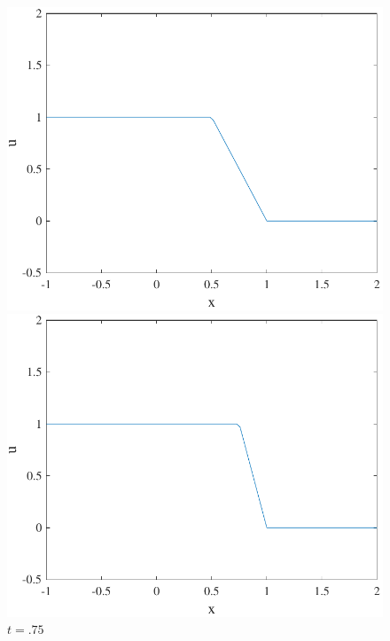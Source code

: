 \documentclass{article}
\begin{document}
\begin{figure}[H]
\begin{minipage}[b]{0.49\textwidth}
  \end{minipage}
    \hfill
  \begin{minipage}[b]{0.49\textwidth}
    \includegraphics[width=\textwidth]{hw_14_plot7.pdf}
    \caption{$t = 0.5$}

  \end{minipage}
    \hfill
  \begin{minipage}[b]{0.49\textwidth}
    \includegraphics[width=\textwidth]{hw_14_plot8.pdf}
    \caption{$t = .75$}


\end{minipage}
\end{figure}
\end{document}
